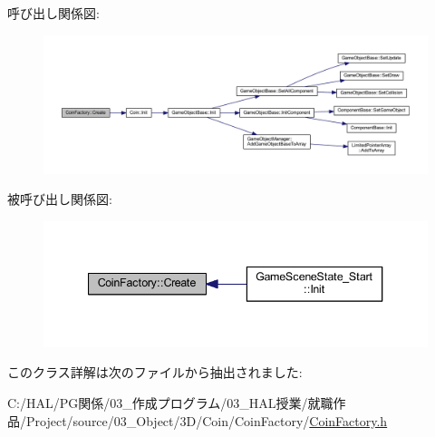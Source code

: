 呼び出し関係図\+:\nopagebreak
\begin{figure}[H]
\begin{center}
\leavevmode
\includegraphics[width=350pt]{class_coin_factory_a0d2390aa7215c9802edabfe11ab62006_cgraph}
\end{center}
\end{figure}
被呼び出し関係図\+:\nopagebreak
\begin{figure}[H]
\begin{center}
\leavevmode
\includegraphics[width=340pt]{class_coin_factory_a0d2390aa7215c9802edabfe11ab62006_icgraph}
\end{center}
\end{figure}


このクラス詳解は次のファイルから抽出されました\+:\begin{DoxyCompactItemize}
\item 
C\+:/\+H\+A\+L/\+P\+G関係/03\+\_\+作成プログラム/03\+\_\+\+H\+A\+L授業/就職作品/\+Project/source/03\+\_\+\+Object/3\+D/\+Coin/\+Coin\+Factory/\mbox{\hyperlink{_coin_factory_8h}{Coin\+Factory.\+h}}\end{DoxyCompactItemize}
